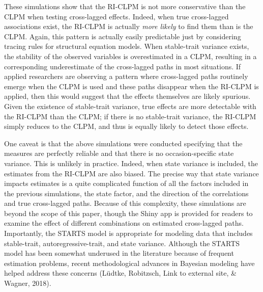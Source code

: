 \documentclass[
  english,
  man,floatsintext]{apa6}
\begin{document}
These simulations show that the RI-CLPM is not more conservative than the CLPM when testing cross-lagged effects. Indeed, when true cross-lagged associations exist, the RI-CLPM is actually \emph{more likely} to find them than is the CLPM. Again, this pattern is actually easily predictable just by considering tracing rules for structural equation models. When stable-trait variance exists, the stability of the observed variables is overestimated in a CLPM, resulting in a corresponding underestimate of the cross-lagged paths in most situations. If applied researchers are observing a pattern where cross-lagged paths routinely emerge when the CLPM is used and these paths disappear when the RI-CLPM is applied, then this would suggest that the effects themselves are likely spurious. Given the existence of stable-trait variance, true effects are more detectable with the RI-CLPM than the CLPM; if there is no stable-trait variance, the RI-CLPM simply reduces to the CLPM, and thus is equally likely to detect those effects.

One caveat is that the above simulations were conducted specifying that the measures are perfectly reliable and that there is no occasion-specific state variance. This is unlikely in practice. Indeed, when state variance is included, the estimates from the RI-CLPM are also biased. The precise way that state variance impacts estimates is a quite complicated function of all the factors included in the previous simulations, the state factor, and the direction of the correlations and true cross-lagged paths. Because of this complexity, these simulations are beyond the scope of this paper, though the Shiny app is provided for readers to examine the effect of different combinations on estimated cross-lagged paths. Importantly, the STARTS model is appropriate for modeling data that includes stable-trait, autoregressive-trait, and state variance. Although the STARTS model has been somewhat underused in the literature because of frequent estimation problems, recent methodological advances in Bayesian modeling have helped address these concerns (Lüdtke, Robitzsch, Link to external site, \& Wagner, 2018).
\end{document}
